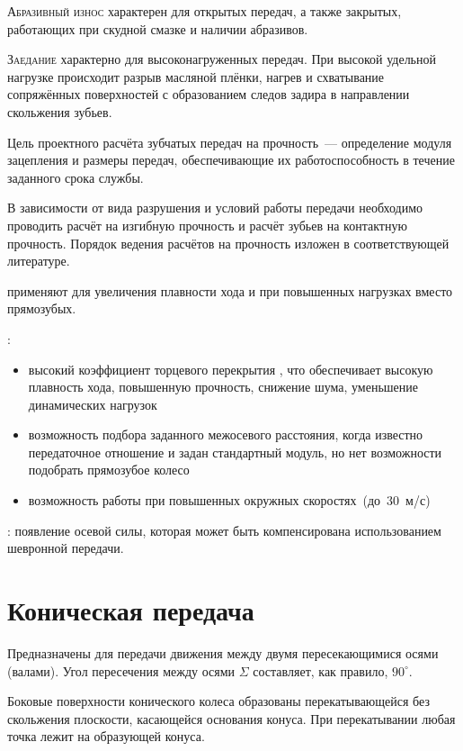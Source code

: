 \documentclass{tufte-book}
\begin{document}
\textsc{Абразивный износ} характерен для открытых передач, а также закрытых, работающих при скудной смазке и наличии абразивов.

\textsc{Заедание} характерно для высоконагруженных передач. При высокой удельной нагрузке происходит разрыв масляной плёнки, нагрев и схватывание сопряжённых поверхностей с образованием следов задира в направлении скольжения зубьев.

Цель проектного расчёта зубчатых передач на прочность~--- определение модуля зацепления и размеры передач, обеспечивающие их работоспособность в течение заданного срока службы. 

В зависимости от вида разрушения и условий работы передачи необходимо проводить расчёт на изгибную прочность и расчёт зубьев на контактную прочность. Порядок ведения расчётов на прочность изложен в соответствующей литературе.

 применяют для увеличения плавности хода и при повышенных нагрузках вместо прямозубых.

:
\begin{itemize}
	\item высокий коэффициент торцевого перекрытия , что обеспечивает высокую плавность хода, повышенную прочность, снижение шума, уменьшение динамических нагрузок
	\item возможность подбора заданного межосевого расстояния, когда известно передаточное отношение и задан стандартный модуль, но нет возможности подобрать прямозубое колесо
	\item возможность работы при повышенных окружных скоростях~(до~30~м/с)
\end{itemize}

: появление осевой силы, которая может быть компенсирована использованием шевронной передачи.


\chapter{Коническая передача}
\label{ch:conic}

Предназначены для передачи движения между двумя пересекающимися осями (валами). Угол пересечения между осями $ \Sigma $ составляет, как правило, $ 90^\circ $.

Боковые поверхности конического колеса образованы перекатывающейся без скольжения плоскости, касающейся основания конуса. При перекатывании любая точка лежит на образующей конуса.
\end{document}
